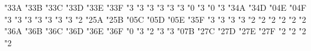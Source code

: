 \mathchardef \risingdotseq   "3\amsafam 3A
\mathchardef \fallingdotseq   "3\amsafam 3B
\mathchardef \succcurlyeq   "3\amsafam 3C
\mathchardef \geqq   "3\amsafam 3D
\mathchardef \geqslant   "3\amsafam 3E
\mathchardef \gtrless   "3\amsafam 3F
\mathchardef \sqsubset   "3
\mathchardef \sqsupset   "3
\mathchardef \vartriangleright   "3
\mathchardef \vartriangleleft   "3
\mathchardef \trianglerighteq   "3
\mathchardef \trianglelefteq   "3
\mathchardef \bigstar   "0
\mathchardef \between   "3
\mathchardef \blacktriangledown   "0
\mathchardef \blacktriangleright   "3
\mathchardef \blacktriangleleft   "3\amsafam 4A
\mathchardef \vartriangle   "3\amsafam 4D
\mathchardef \blacktriangle   "0\amsafam 4E
\mathchardef \triangledown   "0\amsafam 4F
\mathchardef \eqcirc   "3
\mathchardef \lesseqgtr   "3
\mathchardef \gtreqless   "3
\mathchardef \lesseqqgtr   "3
\mathchardef \gtreqqless   "3
\mathchardef \Rrightarrow   "3
\mathchardef \Lleftarrow   "3
\mathchardef \veebar   "2
\mathchardef \barwedge   "2\amsafam 5A
\mathchardef \doublebarwedge   "2\amsafam 5B
\mathchardef \angle   "0\amsafam 5C
\mathchardef \measuredangle   "0\amsafam 5D
\mathchardef \sphericalangle   "0\amsafam 5E
\mathchardef \varpropto   "3\amsafam 5F
\mathchardef \smallsmile   "3
\mathchardef \smallfrown   "3
\mathchardef \Subset   "3
\mathchardef \Supset   "3
\mathchardef \Cup   "2
\mathchardef \Cap   "2
\mathchardef \curlywedge   "2
\mathchardef \curlyvee   "2
\mathchardef \leftthreetimes   "2
\mathchardef \rightthreetimes   "2
\mathchardef \subseteqq   "3\amsafam 6A
\mathchardef \supseteqq   "3\amsafam 6B
\mathchardef \bumpeq   "3\amsafam 6C
\mathchardef \Bumpeq   "3\amsafam 6D
\mathchardef \lll   "3\amsafam 6E
\mathchardef \ggg   "3\amsafam 6F
\def \ulcorner {\delimiter"4\amsafam 70\amsafam 70 }
\def \urcorner {\delimiter"5\amsafam 71\amsafam 71 }
\mathchardef \circledS   "0
\mathchardef \pitchfork   "3
\mathchardef \dotplus   "2
\mathchardef \backsim   "3
\mathchardef \backsimeq   "3
\def \llcorner {\delimiter"4\amsafam 78\amsafam 78 }
\def \lrcorner {\delimiter"5\amsafam 79\amsafam 79 }
\mathchardef \complement   "0\amsafam 7B
\mathchardef \intercal   "2\amsafam 7C
\mathchardef \circledcirc   "2\amsafam 7D
\mathchardef \circledast   "2\amsafam 7E
\mathchardef \circleddash   "2\amsafam 7F
\mathchardef \rhd   "2
\mathchardef \lhd   "2
\mathchardef \unrhd   "2
\mathchardef \unlhd   "2

